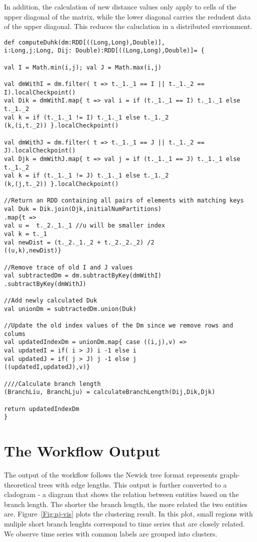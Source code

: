 In addition, the calculation of new distance values only apply to cells of the upper diagonal of the matrix, while the lower diagonal carries the redudent data of the upper diagonal. This reduces the caluclation in a distributed envrionment.   

\begin{lstlisting}[style=myScalastyle,caption={Updating the distance matrix reflecting the merging of the two closest nodes},captionpos=b]
def computeDuhk(dm:RDD[((Long,Long),Double)],
i:Long,j:Long, Dij: Double):RDD[((Long,Long),Double)]= {

val I = Math.min(i,j); val J = Math.max(i,j) 

val dmWithI = dm.filter( t => t._1._1 == I || t._1._2 == I).localCheckpoint()
val Dik = dmWithI.map{ t =>	val i = if (t._1._1 == I) t._1._1 else t._1._2
val k = if (t._1._1 != I) t._1._1 else t._1._2
(k,(i,t._2)) }.localCheckpoint()

val dmWithJ = dm.filter( t => t._1._1 == J || t._1._2 == J).localCheckpoint()
val Djk = dmWithJ.map{ t =>	val j = if (t._1._1 == J) t._1._1 else t._1._2
val k = if (t._1._1 != J) t._1._1 else t._1._2
(k,(j,t._2)) }.localCheckpoint()

//Return an RDD containing all pairs of elements with matching keys
val Duk = Dik.join(Djk,initialNumPartitions)
.map{t =>
val u =  t._2._1._1 //u will be smaller index
val k = t._1
val newDist = (t._2._1._2 + t._2._2._2) /2
((u,k),newDist)}

//Remove trace of old I and J values
val subtractedDm = dm.subtractByKey(dmWithI)
.subtractByKey(dmWithJ)

//Add newly calculated Duk
val unionDm = subtractedDm.union(Duk)

//Update the old index values of the Dm since we remove rows and colums 
val updatedIndexDm = unionDm.map{ case ((i,j),v) =>
val updatedI = if( i > J) i -1 else i
val updatedJ = if( j > J) j -1 else j
((updatedI,updatedJ),v)}

////Calculate branch length
(BranchLiu, BranchLju) = calculateBranchLength(Dij,Dik,Djk)

return updatedIndexDm
}
\end{lstlisting}

\section{The Workflow Output}
The output of the workflow follows the Newick tree format represents graph-theoretical trees with edge lengths. This output is further converted to a cladogram - a diagram that shows the relation between entities based on the branch length. The shorter the branch length, the more related the two entities are. Figure~\ref{Fig:nj-vis} plots the clustering result. In this plot, small regions with muliple short branch lenghts correspond to time series that are closely related.  We observe time series with common labels are grouped into clusters. 

